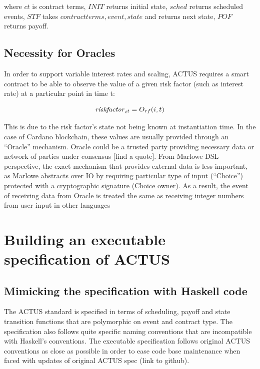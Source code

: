 \documentclass[runningheads]{llncs}
\begin{document}
where $ct$ is contract terms, $INIT$ returns initial state, $sched$
returns scheduled events, $STF$ takes ${contractterms,event,state}$
and returns next state, $POF$ returns payoff.

\subsection{Necessity for Oracles}

In order to support variable interest rates and scaling, ACTUS requires
a smart contract to be able to observe the value of a given risk factor
(such as interest rate) at a particular point in time t:

\noindent 
\begin{equation}
\mbox{\emph{riskfactor}}_{i}{}_{t}=O_{rf}(i,t)
\end{equation}

This is due to the risk factor's state not being known at instantiation
time. In the case of Cardano blockchain, these values are usually
provided through an ``Oracle'' mechanism\cite{oracles}. Oracle
could be a trusted party providing necessary data or network of parties
under consensus {[}find a quote{]}. From Marlowe DSL perspective,
the exact mechanism that provides external data is less important,
as Marlowe abstracts over IO by requiring particular type of input
(``Choice'') protected with a cryptographic signature (Choice owner).
As a result, the event of receiving data from Oracle is treated the
same as receiving integer numbers from user input in other languages

\section{Building an executable specification of ACTUS}
\label{executable}

\subsection{Mimicking the specification with Haskell code}

The ACTUS standard is specified in terms of scheduling, payoff and
state transition functions that are polymorphic on event and contract
type. The specification also follows quite specific naming conventions
that are incompatible with Haskell's conventions. The executable specification
follows original ACTUS conventions as close as possible in order to
ease code base maintenance when faced with updates of original ACTUS
spec (link to github).
\end{document}

